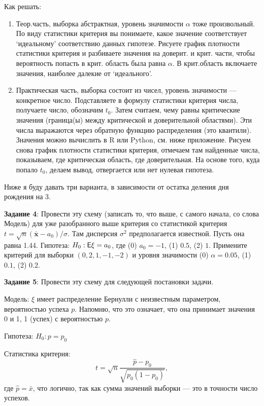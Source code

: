 Как решать:
\begin{enumerate}
\item
Теор.часть, выборка абстрактная, уровень значимости $\alpha$ тоже произвольный. По виду статистики критерия вы понимаете, какое значение соответствует `идеальному' соответствию данных гипотезе. Рисуете график плотности статистики критерия и разбиваете значения на доверит. и крит. части, чтобы вероятность попасть в крит. область была равна $\alpha$. В крит.область включаете значения, наиболее далекие от `идеального'.

\item
Практическая часть, выборка состоит из чисел, уровень значимости --- конкретное число.
Подставляете в формулу статистики критерия числа, получаете число, обозначим $t_0$.
Затем считаем, чему равны критические значения (граница(ы) между критической и доверительной областями). Эти числа выражаются через обратную функцию распределения (это квантили). Значения можно вычислить  в R или Python, см. ниже приложение. Рисуем снова график плотности статистики критерия, отмечаем там найденные числа, показываем, где критическая область, где доверительная. На основе того, куда попало $t_0$, делаем вывод, отвергается или нет нулевая гипотеза.
\end{enumerate}

Ниже я буду давать три варианта, в зависимости от остатка деления дня рождения на 3.

\textbf{Задание 4}: Провести эту схему (записать то, что выше, с самого начала, со слова Модель) для уже разобранного выше критерия со статистикой критерия $t=\sqrt{n}(\bar{\mathbf{x}}-a_{0})/\sigma$. Там дисперсия $\sigma^2$ предполагается известной. Пусть она равна 1.44. Гипотеза: $H_0: \mathsf{E}\xi = a_0$, где (0) $a_0 =-1$, (1) $0.5$, (2) $1$. Примените критерий для выборки $(0,2,1,-1,-2)$ и уровня значимости (0) $\alpha = 0.05$, (1) $0.1$, (2)  $0.2$.

\textbf{Задание 5}: Провести эту схему для следующей постановки задачи.

Модель: $\xi$ имеет распределение Бернулли с неизвестным параметром, вероятностью успеха $p$. Напомню, что это означает, что она принимает значения 0 и 1, 1 (успех) с вероятностью $p$.

Гипотеза: $H_0: p=p_0$

Статистика критерия: \[
t=\sqrt{n}\frac{\hat{p}-p_{0}}{\sqrt{p_{0}(1-p_{0})}},
\]
где $\hat{p} = \bar{x}$, что логично, так как сумма значений выборки --- это в точности число успехов.

